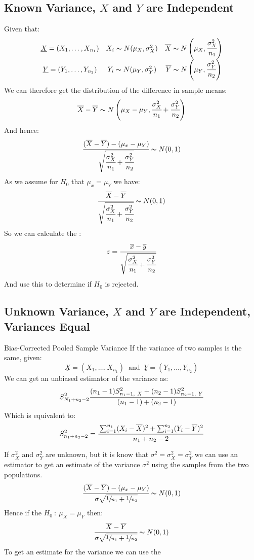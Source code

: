 \subsection{Known Variance, $X$ and $Y$ are Independent}
Given that:
\[\begin{matrix}
		\underline{X} = (X_1, \dots, X_{n_1}) & X_i \thicksim N(\mu_X, \sigma^2_X) & \overline{X} \thicksim N\left(\mu_X, \cfrac{\sigma^2_X}{n_1}\right) \\
		\underline{Y} = (Y_1, \dots, Y_{n_2}) & Y_i \thicksim N(\mu_Y, \sigma^2_Y) & \overline{Y} \thicksim N\left(\mu_Y, \cfrac{\sigma^2_Y}{n_2}\right) \\
	\end{matrix}\]
We can therefore get the distribution of the difference in sample means:
\[\overline{X} - \overline{Y} \thicksim N\left(\mu_X - \mu_Y, \cfrac{\sigma_X^2}{n_1} + \cfrac{\sigma_Y^2}{n_2}\right)\]
And hence:
\[\cfrac{(\overline{X} - \overline{Y}) - (\mu_x - \mu_Y)}{\sqrt{\cfrac{\sigma^2_X}{n_1} + \cfrac{\sigma^2_Y}{n_2}}} \thicksim N(0, 1)\]
As we assume for $H_0$ that $\mu_x = \mu_Y$ we have:
\[\cfrac{\overline{X} - \overline{Y}}{\sqrt{\cfrac{\sigma^2_X}{n_1} + \cfrac{\sigma^2_Y}{n_2}}} \thicksim N(0, 1)\]
So we can calculate the :
\[z = \cfrac{\overline{x} - \overline{y}}{\sqrt{\cfrac{\sigma^2_X}{n_1} + \cfrac{\sigma^2_Y}{n_2}}}\]
And use this to determine if $H_0$ is rejected.
\subsection{Unknown Variance, $X$ and $Y$ are Independent, Variances Equal}
\begin{definitionbox}{Bias-Corrected Pooled Sample Variance}
If the variance of two samples is the same, given:
\[\underline{X} = (X_1, \dots, X_{n_1}) \ \text{  and  } \ \underline{Y} = (Y_1, \dots, Y_{n_2})\]
We can get an unbiased estimator of the variance as:
\[S^2_{N_1 + n_2 - 2}\cfrac{(n_1 - 1)S^2_{n_1 - 1, \ X} + (n_2 - 1)S^2_{n_2 - 1, \ Y}}{(n_1 - 1) + (n_2 - 1)}\]
Which is equivalent to:
\[S^2_{n_1 + n_2 - 2} = \cfrac{\sum_{i=1}^{n_1}(X_i - \overline{X})^2 + \sum_{i=1}^{n_2}(Y_i - \overline{Y})^2}{n_1 + n_2 - 2}\]
\end{definitionbox}
If $\sigma^2_X$ and $\sigma^2_Y$ are unknown, but it is know that $\sigma^2 = \sigma^2_X = \sigma^2_Y$ we can use an estimator to get an estimate of the variance $\sigma^2$ using the samples from the two populations.
\[\cfrac{(\overline{X} - \overline{Y}) - (\mu_x - \mu_Y)}{\sigma \sqrt{\sfrac{1}{n_1} + \sfrac{1}{n_2}}} \thicksim N(0,1)\]
Hence if the $H_0 \ : \ \mu_X = \mu_Y$ then:
\[\cfrac{\overline{X} - \overline{Y}}{\sigma \sqrt{\sfrac{1}{n_1} + \sfrac{1}{n_2}}}\thicksim N(0,1)\]
To get an estimate for the variance we can use the 

